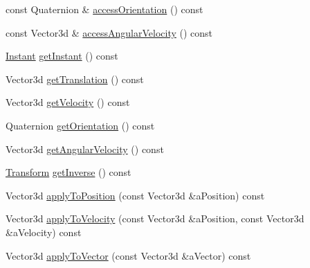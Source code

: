 \begin{DoxyCompactItemize}
\item 
const Quaternion \& \hyperlink{classlibrary_1_1physics_1_1coord_1_1_transform_aac7f3bf9570d378aab4e9c62f3478560}{access\+Orientation} () const
\item 
const Vector3d \& \hyperlink{classlibrary_1_1physics_1_1coord_1_1_transform_a0e7dc9e3c40a5e3b836ccb10e250d207}{access\+Angular\+Velocity} () const
\item 
\hyperlink{classlibrary_1_1physics_1_1time_1_1_instant}{Instant} \hyperlink{classlibrary_1_1physics_1_1coord_1_1_transform_a674c8ac4676d07aa641b85e049233838}{get\+Instant} () const
\item 
Vector3d \hyperlink{classlibrary_1_1physics_1_1coord_1_1_transform_a9cdc57080aff638c321de68564bf913b}{get\+Translation} () const
\item 
Vector3d \hyperlink{classlibrary_1_1physics_1_1coord_1_1_transform_aa5d6b48208919b34cdafb9ea56aaef12}{get\+Velocity} () const
\item 
Quaternion \hyperlink{classlibrary_1_1physics_1_1coord_1_1_transform_a401692acc8f82e03373feed88c6d45b2}{get\+Orientation} () const
\item 
Vector3d \hyperlink{classlibrary_1_1physics_1_1coord_1_1_transform_a06059603f73cc34da4cd1d731e1c09fa}{get\+Angular\+Velocity} () const
\item 
\hyperlink{classlibrary_1_1physics_1_1coord_1_1_transform}{Transform} \hyperlink{classlibrary_1_1physics_1_1coord_1_1_transform_a4d2cbec2ec7dadd2b4f8dd1d4184b692}{get\+Inverse} () const
\item 
Vector3d \hyperlink{classlibrary_1_1physics_1_1coord_1_1_transform_ae55f2f7fc9769d42ac31f9e5fd0ddfe5}{apply\+To\+Position} (const Vector3d \&a\+Position) const
\item 
Vector3d \hyperlink{classlibrary_1_1physics_1_1coord_1_1_transform_a017c1ec77f5ddda3f7d93dd63a9a6d3f}{apply\+To\+Velocity} (const Vector3d \&a\+Position, const Vector3d \&a\+Velocity) const
\item 
Vector3d \hyperlink{classlibrary_1_1physics_1_1coord_1_1_transform_a0709a5af7a97adbda05a24b9d4ad677d}{apply\+To\+Vector} (const Vector3d \&a\+Vector) const
\end{DoxyCompactItemize}
